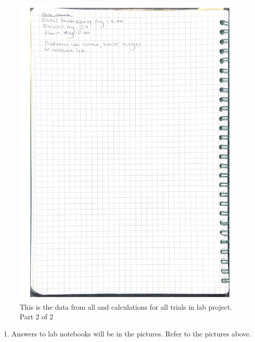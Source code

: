 \documentclass[idxtotoc,hyperref,openany]{labbook} %
\begin{document}
\begin{figure}[H] %
\begin{center}
\includegraphics[width=0.8\linewidth]{images/Lab.08/Lab08Calc2.png}
\end{center}
\caption{This is the data from all and calculations for all trials in lab project. Part 2 of 2}
\label{fig:Lab08Calc2}
\end{figure}


\begin{enumerate}
    \item Answers to lab notebooks will be in the pictures. Refer to the pictures above.
\end{enumerate}


\end{document}
